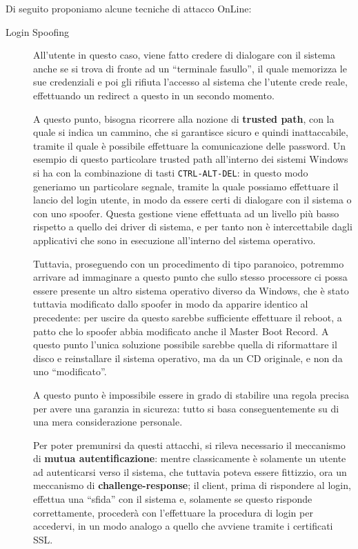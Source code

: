 Di seguito proponiamo alcune tecniche di attacco OnLine:
\begin{description}
\item[Login Spoofing] All'utente in questo caso, viene fatto credere di
	dialogare con il sistema anche se si trova di fronte ad un ``terminale
	fasullo'', il quale memorizza le sue credenziali e poi gli rifiuta 
	l'accesso al sistema che l'utente crede reale, effettuando un redirect
	a questo in un secondo momento.
	
	A questo punto, bisogna ricorrere alla nozione di \textbf{trusted path}, con
	la quale si indica un cammino, che si garantisce sicuro e quindi
	inattaccabile, tramite il quale è possibile effettuare la comunicazione
	delle password. 
	Un esempio di questo particolare trusted path all'interno dei sistemi
	Windows si ha con la combinazione di tasti \texttt{CTRL-ALT-DEL}: in questo
	modo generiamo un particolare segnale, tramite la quale possiamo 
	effettuare il lancio del login utente, in modo da essere certi di dialogare 
	con il sistema o con uno spoofer.
	Questa gestione viene effettuata ad un livello più basso rispetto a 
	quello dei driver di sistema, e per tanto non è intercettabile dagli
	applicativi che sono in esecuzione all'interno del sistema operativo.
	
	
	Tuttavia, proseguendo con un procedimento di tipo paranoico, potremmo
	arrivare ad immaginare a questo punto che sullo stesso processore
	ci possa essere presente un altro sistema operativo diverso da Windows,
	che è stato tuttavia modificato dallo spoofer in modo da apparire identico
	al precedente: per uscire da questo sarebbe sufficiente effettuare il
	reboot, a patto che lo spoofer abbia modificato anche il Master Boot
	Record. A questo punto l'unica soluzione possibile sarebbe quella di 
	riformattare il disco e reinstallare il sistema operativo, ma da un
	CD originale, e non da uno ``modificato''.
	
	A questo punto è impossibile essere in grado di stabilire una regola
	precisa per avere una garanzia in sicureza: tutto
	si basa conseguentemente su di una mera considerazione personale.
	
	Per poter premunirsi da questi attacchi, si rileva necessario il meccanismo
	di \textbf{mutua autentificazione}: mentre classicamente è solamente un utente 
	ad autenticarsi verso il sistema, che tuttavia poteva 
	essere fittizzio, ora
	un meccanismo di \textbf{challenge-response};
	il client, prima di rispondere al login, effettua una ``sfida'' con il
	sistema e, solamente se questo risponde correttamente, procederà con
	l'effettuare la procedura di login per accedervi, in un modo analogo 
	a quello che avviene tramite i certificati SSL. 
	

\end{description}

